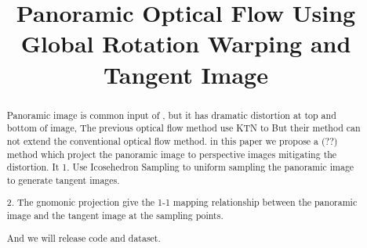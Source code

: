 \documentclass{bmvc2k}
\title{Panoramic Optical Flow Using Global Rotation Warping and Tangent Image}
\begin{document}
\maketitle

\begin{abstract}

Panoramic image is common input of , but it has dramatic distortion at top and bottom of image, 
The previous optical flow method use KTN to 
But their method can not extend the conventional optical flow method.
in this paper we propose a (??) method which project the panoramic image to perspective images mitigating the distortion.
It 
1. Use Icosehedron Sampling to uniform sampling the panoramic image to generate tangent images.

2. The gnomonic projection give the 1-1 mapping relationship between the panoramic image and the tangent image at the sampling points.

And we will release code and dataset.

\end{abstract}














\end{document}

